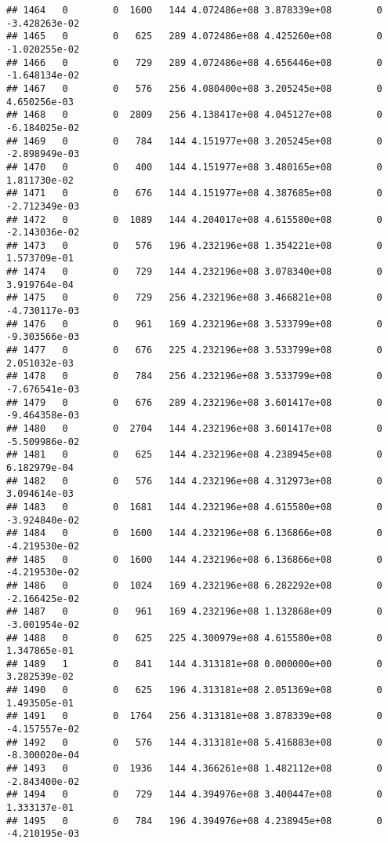 \documentclass[
]{article}
\begin{document}
\begin{enumerate}
\begin{verbatim}
## 1464   0        0  1600   144 4.072486e+08 3.878339e+08        0 -3.428263e-02
## 1465   0        0   625   289 4.072486e+08 4.425260e+08        0 -1.020255e-02
## 1466   0        0   729   289 4.072486e+08 4.656446e+08        0 -1.648134e-02
## 1467   0        0   576   256 4.080400e+08 3.205245e+08        0  4.650256e-03
## 1468   0        0  2809   256 4.138417e+08 4.045127e+08        0 -6.184025e-02
## 1469   0        0   784   144 4.151977e+08 3.205245e+08        0 -2.898949e-03
## 1470   0        0   400   144 4.151977e+08 3.480165e+08        0  1.811730e-02
## 1471   0        0   676   144 4.151977e+08 4.387685e+08        0 -2.712349e-03
## 1472   0        0  1089   144 4.204017e+08 4.615580e+08        0 -2.143036e-02
## 1473   0        0   576   196 4.232196e+08 1.354221e+08        0  1.573709e-01
## 1474   0        0   729   144 4.232196e+08 3.078340e+08        0  3.919764e-04
## 1475   0        0   729   256 4.232196e+08 3.466821e+08        0 -4.730117e-03
## 1476   0        0   961   169 4.232196e+08 3.533799e+08        0 -9.303566e-03
## 1477   0        0   676   225 4.232196e+08 3.533799e+08        0  2.051032e-03
## 1478   0        0   784   256 4.232196e+08 3.533799e+08        0 -7.676541e-03
## 1479   0        0   676   289 4.232196e+08 3.601417e+08        0 -9.464358e-03
## 1480   0        0  2704   144 4.232196e+08 3.601417e+08        0 -5.509986e-02
## 1481   0        0   625   144 4.232196e+08 4.238945e+08        0  6.182979e-04
## 1482   0        0   576   144 4.232196e+08 4.312973e+08        0  3.094614e-03
## 1483   0        0  1681   144 4.232196e+08 4.615580e+08        0 -3.924840e-02
## 1484   0        0  1600   144 4.232196e+08 6.136866e+08        0 -4.219530e-02
## 1485   0        0  1600   144 4.232196e+08 6.136866e+08        0 -4.219530e-02
## 1486   0        0  1024   169 4.232196e+08 6.282292e+08        0 -2.166425e-02
## 1487   0        0   961   169 4.232196e+08 1.132868e+09        0 -3.001954e-02
## 1488   0        0   625   225 4.300979e+08 4.615580e+08        0  1.347865e-01
## 1489   1        0   841   144 4.313181e+08 0.000000e+00        0  3.282539e-02
## 1490   0        0   625   196 4.313181e+08 2.051369e+08        0  1.493505e-01
## 1491   0        0  1764   256 4.313181e+08 3.878339e+08        0 -4.157557e-02
## 1492   0        0   576   144 4.313181e+08 5.416883e+08        0 -8.300020e-04
## 1493   0        0  1936   144 4.366261e+08 1.482112e+08        0 -2.843400e-02
## 1494   0        0   729   144 4.394976e+08 3.400447e+08        0  1.333137e-01
## 1495   0        0   784   196 4.394976e+08 4.238945e+08        0 -4.210195e-03

\end{verbatim}
\end{enumerate}
\end{document}
